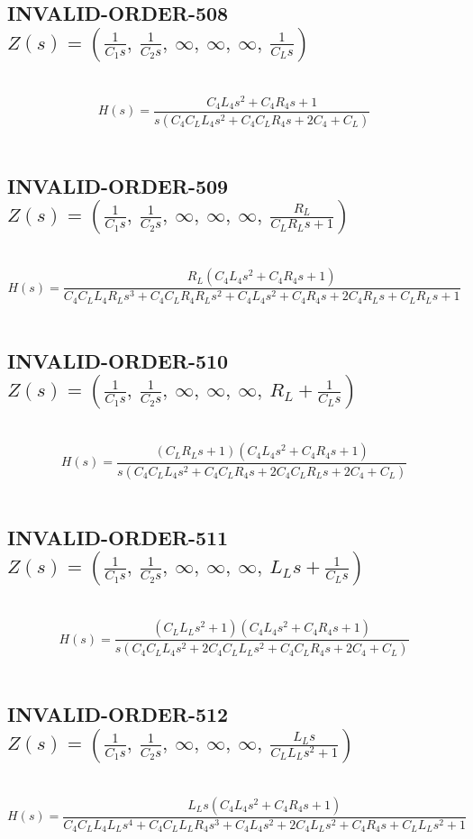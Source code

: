 \documentclass{article}
\begin{document}
\subsection{INVALID-ORDER-508 $Z(s) = \left( \frac{1}{C_{1} s}, \  \frac{1}{C_{2} s}, \  \infty, \  \infty, \  \infty, \  \frac{1}{C_{L} s}\right)$ } \ 
\textbf{\[H(s) = \frac{C_{4} L_{4} s^{2} + C_{4} R_{4} s + 1}{s \left(C_{4} C_{L} L_{4} s^{2} + C_{4} C_{L} R_{4} s + 2 C_{4} + C_{L}\right)}\] } \ 
\subsection{INVALID-ORDER-509 $Z(s) = \left( \frac{1}{C_{1} s}, \  \frac{1}{C_{2} s}, \  \infty, \  \infty, \  \infty, \  \frac{R_{L}}{C_{L} R_{L} s + 1}\right)$ } \ 
\textbf{\[H(s) = \frac{R_{L} \left(C_{4} L_{4} s^{2} + C_{4} R_{4} s + 1\right)}{C_{4} C_{L} L_{4} R_{L} s^{3} + C_{4} C_{L} R_{4} R_{L} s^{2} + C_{4} L_{4} s^{2} + C_{4} R_{4} s + 2 C_{4} R_{L} s + C_{L} R_{L} s + 1}\] } \ 
\subsection{INVALID-ORDER-510 $Z(s) = \left( \frac{1}{C_{1} s}, \  \frac{1}{C_{2} s}, \  \infty, \  \infty, \  \infty, \  R_{L} + \frac{1}{C_{L} s}\right)$ } \ 
\textbf{\[H(s) = \frac{\left(C_{L} R_{L} s + 1\right) \left(C_{4} L_{4} s^{2} + C_{4} R_{4} s + 1\right)}{s \left(C_{4} C_{L} L_{4} s^{2} + C_{4} C_{L} R_{4} s + 2 C_{4} C_{L} R_{L} s + 2 C_{4} + C_{L}\right)}\] } \ 
\subsection{INVALID-ORDER-511 $Z(s) = \left( \frac{1}{C_{1} s}, \  \frac{1}{C_{2} s}, \  \infty, \  \infty, \  \infty, \  L_{L} s + \frac{1}{C_{L} s}\right)$ } \ 
\textbf{\[H(s) = \frac{\left(C_{L} L_{L} s^{2} + 1\right) \left(C_{4} L_{4} s^{2} + C_{4} R_{4} s + 1\right)}{s \left(C_{4} C_{L} L_{4} s^{2} + 2 C_{4} C_{L} L_{L} s^{2} + C_{4} C_{L} R_{4} s + 2 C_{4} + C_{L}\right)}\] } \ 
\subsection{INVALID-ORDER-512 $Z(s) = \left( \frac{1}{C_{1} s}, \  \frac{1}{C_{2} s}, \  \infty, \  \infty, \  \infty, \  \frac{L_{L} s}{C_{L} L_{L} s^{2} + 1}\right)$ } \ 
\textbf{\[H(s) = \frac{L_{L} s \left(C_{4} L_{4} s^{2} + C_{4} R_{4} s + 1\right)}{C_{4} C_{L} L_{4} L_{L} s^{4} + C_{4} C_{L} L_{L} R_{4} s^{3} + C_{4} L_{4} s^{2} + 2 C_{4} L_{L} s^{2} + C_{4} R_{4} s + C_{L} L_{L} s^{2} + 1}\] } \ 
\end{document}
